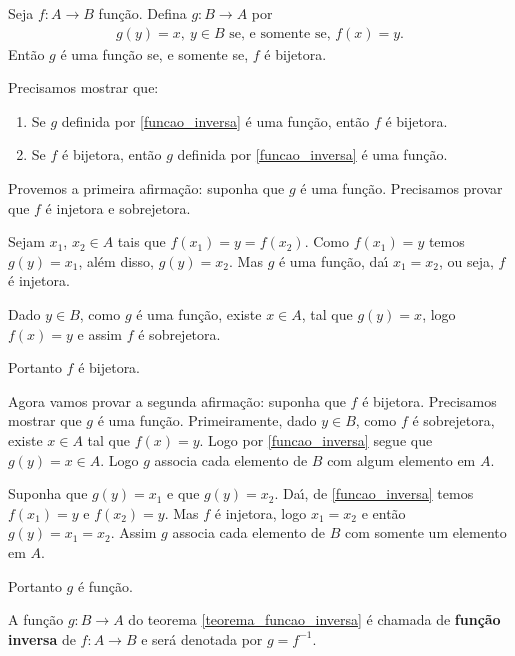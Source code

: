 \begin{teorema}\label{teorema_funcao_inversa}
	Seja $f: A \to B$ fun{\c c}{\~a}o. Defina $g : B \to A$ por
	\begin{align}\label{funcao_inversa}
		g(y) = x,\ y \in B \mbox{ se, e somente se, } f(x) = y.
	\end{align}
	Ent{\~a}o $g$ {\'e} uma fun{\c c}{\~a}o se, e somente se, $f$ {\'e} bijetora.
\end{teorema}
\begin{prova}
	Precisamos mostrar que:
	\begin{enumerate}
		\item Se $g$ definida por \eqref{funcao_inversa} é uma função, então $f$ é bijetora.
		\item Se $f$ é bijetora, então $g$ definida por \eqref{funcao_inversa} é uma função.
	\end{enumerate}

	Provemos a primeira afirmação: suponha que $g$ é uma função. Precisamos provar que $f$ {\'e} injetora e sobrejetora.

	Sejam $x_1$, $x_2 \in A$ tais que $f(x_1) = y = f(x_2)$. Como $f(x_1) = y$ temos $g(y) = x_1$, al{\'e}m disso, $g(y) = x_2$. Mas $g$ {\'e} uma fun{\c c}{\~a}o, da{\'\i} $x_1 = x_2$, ou seja, $f$ {\'e} injetora.

	Dado $y \in B$, como $g$ {\'e} uma fun{\c c}{\~a}o, existe $x \in A$, tal que $g(y) = x$, logo $f(x) = y$ e assim $f$ {\'e} sobrejetora.

	Portanto $f$ {\'e} bijetora.

	Agora vamos provar a segunda afirmação: suponha que $f$ é bijetora. Precisamos mostrar que $g$ é uma função. Primeiramente, dado $y \in B$, como $f$ {\'e} sobrejetora, existe $x \in A$ tal que $f(x) = y$. Logo por \eqref{funcao_inversa} segue que $g(y) = x \in A$. Logo $g$ associa cada elemento de $B$ com algum elemento em $A$.

	Suponha que $g(y) = x_1$ e que $g(y) = x_2$. Da{\'\i}, de \eqref{funcao_inversa} temos $f(x_1) = y$ e $f(x_2) = y$. Mas $f$ {\'e} injetora, logo $x_1 = x_2$ e ent{\~a}o $g(y) = x_1 = x_2$. Assim $g$ associa cada elemento de $B$ com somente um elemento em $A$.

	Portanto $g$ {\'e} fun{\c c}{\~a}o.
\end{prova}


\begin{definicao}
	A função $g : B \to A$ do teorema \ref{teorema_funcao_inversa} é chamada de \textbf{função inversa} de $f : A \to B$ e será denotada por $g = f^{-1}$.
\end{definicao}


